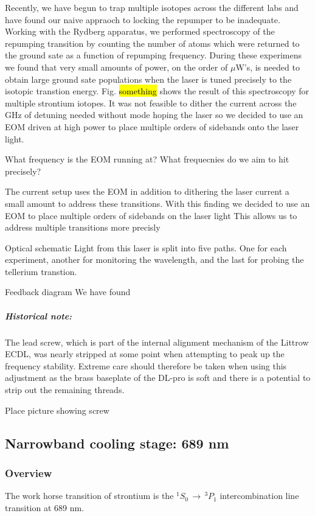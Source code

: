 Recently, we have begun to trap multiple isotopes across the different labs and have found our naive appraoch to locking the repumper to be inadequate.
Working with the Rydberg apparatus, we performed spectroscopy of the repumping transition by counting the number of atoms which were returned to the ground sate as a function of repumping frequency.
During these experimens we found that very small amounts of power, on the order of $\mu$W's, is needed to obtain large ground sate populations when the laser is tuned precisely to the isotopic transtion energy. 
Fig. \hl{something} shows the result of this spectroscopy for multiple strontium iotopes.
It was not feasible to dither the current across the GHz of detuning needed without mode hoping the laser so we decided to use an EOM driven at high power to place multiple orders of sidebands onto the laser light.

What frequency is the EOM running at?
What frequecnies do we aim to hit precisely?

The current setup uses the EOM in addition to dithering the laser current a small amount to address these transitions.
With this finding we decided to use an EOM to place multiple orders of sidebands on the laser light
This allows us to address multiple transitions more precisly

Optical schematic
Light from this laser is split into five paths.
One for each experiment, another for monitoring the wavelength, and the last for probing the tellerium transtion.

Feedback diagram
We have found

\subparagraph{Historical note:}
The lead screw, which is part of the internal alignment mechanism of the Littrow ECDL, was nearly stripped at some point when attempting to peak up the frequency stability. 
Extreme care should therefore be taken when using this adjustment as the brass baseplate of the DL-pro is soft and there is a potential to strip out the remaining threads.
 
Place picture showing screw


\subsection{Narrowband cooling stage: 689 nm} \label{ssec:689sys}
\subsubsection{Overview}
The work horse transition of strontium is the $^1S_0\,\rightarrow\,^3P_1$ intercombination line transition at 689 nm. 

